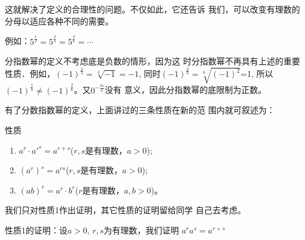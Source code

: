 这就解决了定义的合理性的问题。不仅如此，它还告诉
我们，可以改变有理数的分母以适应各种不同的需要。

例如：$5^{\tfrac{1}{2}}=5^{\tfrac{2}{4}}=5^{\tfrac{3}{6}}=\cdots$

\begin{rmk}
    分指数幂的定义不考虑底是负数的情形，因为这
    时分指数幂不再具有上述的重要性质．例如，$(-1)^{\tfrac{1}{3}}=\sqrt[3]{-1}=-1$, 同时$(-1)^{\tfrac{2}{6}}=\sqrt[6]{(-1)^2}$=1, 所以$(-1)^{\tfrac{1}{3}}\ne (-1)^{\tfrac{2}{6}}$。又$0^{-\tfrac{m}{n}}$没有
意义，因此分指数幂的底限制为正数。
\end{rmk}

有了分数指数幂的定义，上面讲过的三条性质在新的范
围内就可叙述为：
\begin{blk}{性质}
\begin{enumerate}
    \item  $a^r\cdot a'^s=a^{r+s}$\quad ($r,s$是有理数，$a>0$);
    \item  $(a^r)^s=a^{rs}$\quad ($r,s$是有理数，$a>0$);
    \item  $(ab)^r=a^r\cdot b^r$\quad ($r$是有理数，$a,b>0$)。
\end{enumerate}  
\end{blk}

我们只对性质1作出证明，其它性质的证明留给同学
自己去考虑。

性质1的证明：设$a>0$, $r,s$为有理数，我们证明
$a^r a^s=a^{r+s}$

